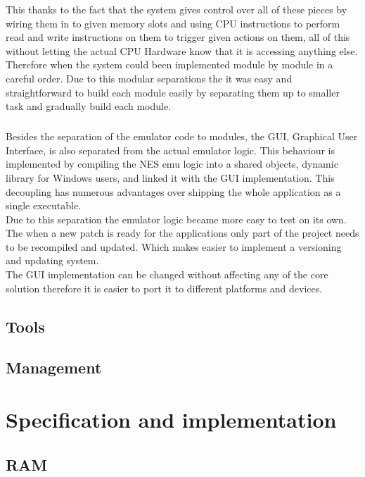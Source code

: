 \documentclass[]{report}
\begin{document}
This thanks to the fact that the system gives control over all of these pieces by wiring them in to given memory slots and using CPU instructions to perform read and write instructions on them to trigger given actions on them, all of this without letting the actual CPU Hardware know that it is accessing anything else. Therefore when the system could been implemented module by module in a careful order. Due to this modular separations the it was easy  and straightforward to build each module easily by separating them up to smaller task and gradually build each module.
\paragraph{ }
Besides the separation of the emulator code to modules, the GUI, Graphical User Interface,  is also separated from the actual emulator logic. This behaviour is implemented by compiling the NES emu logic into a shared objects, dynamic library for Windows users, and linked it with the GUI implementation. This decoupling has numerous advantages over shipping the whole application as a single executable.
\\ 
Due to this separation the emulator logic became more easy to test on its own. 
\\ 
The when a new patch is ready for the applications only part of the project needs to be recompiled and updated. Which makes easier to implement a versioning and updating system.
\\ 
The GUI implementation can be changed without affecting any of the core solution therefore it is easier to port it to different platforms and devices.

\section{Tools}


\section{Management}



\chapter{Specification and implementation}

\section{RAM}
\end{document}
